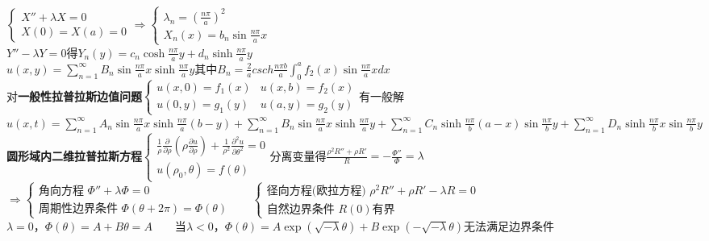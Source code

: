 \documentclass[10pt,a4paper]{article}
\begin{document}
\begin{multicols}{2}
$\left\{\begin{array}{l}X''+\lambda X=0\\X(0)=X(a)=0\end{array}\right.\Longrightarrow\left\{\begin{array}{l}\lambda_n=(\frac{n\pi}{a})^2\\X_n(x)=b_n\sin\frac{n\pi}{a}x\end{array}\right.$\\
$Y''-\lambda Y=0$得$Y_n(y)=c_n\cosh\frac{n\pi}{a}y+d_n\sinh\frac{n\pi}{a}y$\\
$u(x,y)=\sum_{n=1}^{\infty}B_n\sin\frac{n\pi}{a}x\sinh\frac{n\pi}{a}y$其中$B_n=\frac{2}{a}csch\frac{n\pi b}{a}\int_0^af_2(x)\sin\frac{n\pi}{a}xdx$\\
对\textbf{一般性拉普拉斯边值问题}$\left\{\begin{array}{ll}u(x,0)=f_1(x)&u(x,b)=f_2(x)\\u(0,y)=g_1(y)&u(a,y)=g_2(y)\end{array}\right.$有一般解$u(x,t)=\sum_{n=1}^{\infty}A_n\sin\frac{n\pi}{a}x\sinh\frac{n\pi}{a}(b-y)+\sum_{n=1}^{\infty}B_n\sin\frac{n\pi}{a}x\sinh\frac{n\pi}{a}y+\sum_{n=1}^{\infty}C_n\sinh\frac{n\pi}{b}(a-x)\sin\frac{n\pi}{b}y+\sum_{n=1}^{\infty}D_n\sinh\frac{n\pi}{b}x\sin\frac{n\pi}{b}y$\\
\textbf{圆形域内二维拉普拉斯方程}$\left\{\begin{array}{l}\frac{1}{\rho}\frac{\partial}{\partial\rho}(\rho\frac{\partial u}{\partial\rho})+\frac{1}{\rho^2}\frac{\partial^2u}{\partial\theta^2}=0\\u(\rho_0,\theta)=f(\theta)\end{array}\right.$分离变量得$\frac{\rho^2R''+\rho R'}{R}=-\frac{\Phi''}{\Phi}=\lambda$\\
\indent$\Longrightarrow\left\{\begin{array}{l}\text{角向方程 }\Phi''+\lambda\Phi=0\\\text{周期性边界条件 }\Phi(\theta+2\pi)=\Phi(\theta)\end{array}\right.~~~~~~~~\left\{\begin{array}{l}\text{径向方程(欧拉方程) }\rho^2R''+\rho R'-\lambda R=0\\\text{自然边界条件 }R(0)\text{有界}\end{array}\right.$\\
$\lambda=0$，$\Phi(\theta)=A+B\theta=A$~~~~当$\lambda<0$，$\Phi(\theta)=A\exp(\sqrt{-\lambda}\theta)+B\exp(-\sqrt{-\lambda}\theta)$无法满足边界条件\\

\end{multicols}
\end{document}
